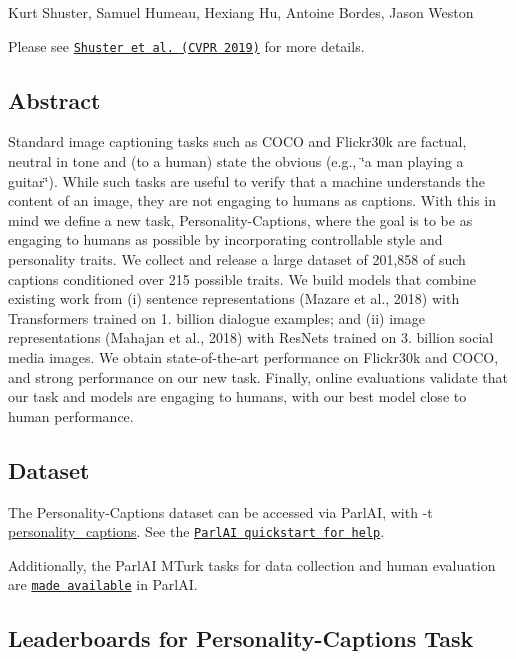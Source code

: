 Kurt Shuster, Samuel Humeau, Hexiang Hu, Antoine Bordes, Jason Weston

Please see \href{https://arxiv.org/abs/1810.10665}{\tt Shuster et al. (C\+V\+PR 2019)} for more details.

\subsection*{Abstract}

Standard image captioning tasks such as C\+O\+CO and Flickr30k are factual, neutral in tone and (to a human) state the obvious (e.\+g., \char`\"{}a man playing a guitar\char`\"{}). While such tasks are useful to verify that a machine understands the content of an image, they are not engaging to humans as captions. With this in mind we define a new task, Personality-\/\+Captions, where the goal is to be as engaging to humans as possible by incorporating controllable style and personality traits. We collect and release a large dataset of 201,858 of such captions conditioned over 215 possible traits. We build models that combine existing work from (i) sentence representations (Mazare et al., 2018) with Transformers trained on 1. billion dialogue examples; and (ii) image representations (Mahajan et al., 2018) with Res\+Nets trained on 3. billion social media images. We obtain state-\/of-\/the-\/art performance on Flickr30k and C\+O\+CO, and strong performance on our new task. Finally, online evaluations validate that our task and models are engaging to humans, with our best model close to human performance.

\subsection*{Dataset}

The Personality-\/\+Captions dataset can be accessed via Parl\+AI, with {\ttfamily -\/t \hyperlink{namespacepersonality__captions}{personality\+\_\+captions}}. See the \href{http://www.parl.ai/static/docs/tutorial_quick.html}{\tt Parl\+AI quickstart for help}.

Additionally, the Parl\+AI M\+Turk tasks for data collection and human evaluation are \href{https://github.com/facebookresearch/ParlAI/tree/master/parlai/mturk/tasks/personality_captions}{\tt made available} in Parl\+AI.

\subsection*{Leaderboards for Personality-\/\+Captions Task}

